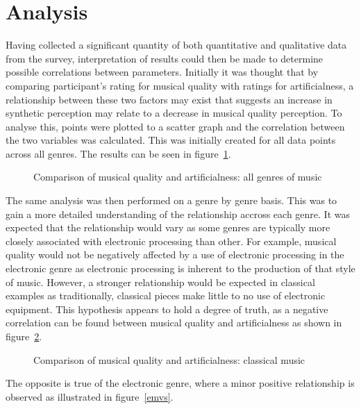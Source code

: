 \documentclass[titlepage]{scrartcl}
\begin{document}
    \section{Analysis}\label{analysis}
    Having collected a significant quantity of both quantitative and
    qualitative data from the survey, interpretation of results could then be
    made to determine possible correlations between parameters. Initially it
    was thought that by comparing participant's rating for musical quality with
    ratings for artificialness, a relationship between these two factors may
    exist that suggests an increase in synthetic perception may relate to a
    decrease in musical quality perception. To analyse this, points were
    plotted to a scatter graph and the correlation between the two variables
    was calculated. This was initially created for all data points across all
    genres. The results can be seen in figure~\ref{agmvs}.
    \begin{figure}[H]
        \caption{Comparison of musical quality and artificialness: all genres of music}
        \label{agmvs}
    \end{figure}
    The same analysis was then performed on a genre by genre basis. This was to
    gain a more detailed understanding of the relationship accross each genre.
    It was expected that the relationship would vary as some genres are
    typically more closely associated with electronic processing than other.
    For example, musical quality would not be negatively affected by a use of
    electronic processing in the electronic genre as electronic processing is
    inherent to the production of that style of music. However, a stronger
    relationship would be expected in classical examples as traditionally,
    classical pieces make little to no use of electronic equipment. This
    hypothesis appears to hold a degree of truth, as a negative correlation can
    be found between musical quality and artificialness as shown in
    figure~\ref{cmvs}.

    \begin{figure}[H]
        \caption{Comparison of musical quality and artificialness: classical music}
        \label{cmvs}
    \end{figure}
    The opposite is true of the electronic genre, where a minor positive
    relationship is observed as illustrated in figure~\ref{emvs}.
\end{document}
